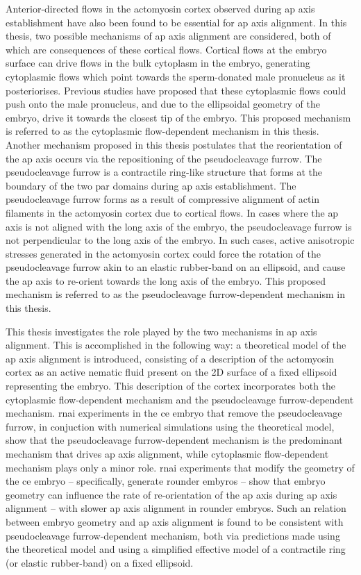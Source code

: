 Anterior-directed flows in the actomyosin cortex observed during \acs{ap} axis establishment have also been found to be essential for \acs{ap} axis alignment. In this thesis, two possible mechanisms of \acs{ap} axis alignment are considered, both of which are consequences of these cortical flows. Cortical flows at the embryo surface can drive flows in the bulk cytoplasm in the embryo, generating cytoplasmic flows which point towards the sperm-donated male pronucleus as it posteriorises. Previous studies have proposed that these cytoplasmic flows could push onto the male pronucleus, and due to the ellipsoidal geometry of the embryo, drive it towards the closest tip of the embryo. This proposed mechanism is referred to as the cytoplasmic flow-dependent mechanism in this thesis. Another mechanism proposed in this thesis postulates that the reorientation of the \acs{ap} axis occurs via the repositioning of the pseudocleavage furrow. The pseudocleavage furrow is a contractile ring-like structure that forms at the boundary of the two \acs{par} domains during \acs{ap} axis establishment. The pseudocleavage furrow forms as a result of compressive alignment of actin filaments in the actomyosin cortex due to cortical flows. In cases where the \acs{ap} axis is not aligned with the long axis of the embryo, the pseudocleavage furrow is
not perpendicular to the long axis of the embryo. In such cases, active anisotropic stresses generated in the actomyosin cortex could force the rotation of the pseudocleavage furrow akin to an elastic rubber-band on an ellipsoid, and cause the \acs{ap} axis to re-orient towards the long axis of the embryo. This proposed mechanism is referred to as the pseudocleavage furrow-dependent mechanism in this thesis.

This thesis investigates the role played by the two mechanisms in \acs{ap} axis alignment. This is accomplished in the following way: a theoretical model of the \acs{ap} axis alignment is introduced, consisting of a description of the actomyosin cortex as an active nematic fluid present on the 2D surface of a fixed ellipsoid representing the embryo. This description of the cortex incorporates both the cytoplasmic flow-dependent mechanism and the pseudocleavage furrow-dependent mechanism. \acs{rnai} experiments in the \acs{ce} embryo that remove the pseudocleavage furrow, in conjuction with numerical simulations using the theoretical model, show that the pseudocleavage furrow-dependent mechanism is the predominant mechanism that drives \acs{ap} axis alignment, while cytoplasmic flow-dependent mechanism plays only a minor role. \acs{rnai} experiments that modify the geometry of the \acs{ce} embryo -- specifically, generate rounder embyros -- show that embryo geometry can influence the rate of re-orientation of the \acs{ap} axis during \acs{ap} axis alignment -- with slower \acs{ap} axis alignment in rounder embryos. Such an relation between embryo geometry and \acs{ap} axis alignment is found to be consistent with pseudocleavage furrow-dependent mechanism, both via predictions made using the theoretical model and using a simplified effective model of a contractile ring (or elastic rubber-band) on a fixed ellipsoid. 

